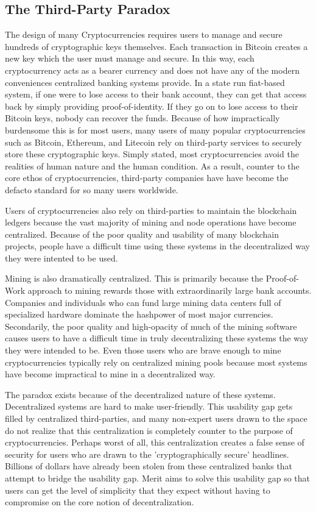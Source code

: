 \documentclass{article}
\begin{document}
\subsection{The Third-Party Paradox}

The design of many Cryptocurrencies requires users to manage and secure hundreds
of cryptographic keys themselves.  Each \gls{transaction} in \gls{Bitcoin} creates
a new key which the user must manage and secure.  In this way, each cryptocurrency
acts as a \gls{bearer currency} and does not have any of the modern conveniences
centralized banking systems provide.  In a state run fiat-based system, if one 
were to lose access to their bank account, they can get that access back 
by simply providing proof-of-identity.  If they go on to lose access to their 
\gls{Bitcoin} keys, nobody can recover the funds.  Because of how impractically 
burdensome this is for most users, many users of many popular cryptocurrencies 
such as \gls{Bitcoin}, \gls{Ethereum}, and \gls{Litecoin} rely on third-party
services to securely store these cryptographic keys.  Simply stated, most
cryptocurrencies avoid the realities of human nature and the human condition. 
As a result, counter to the core ethos of cryptocurrencies, third-party companies
have have become the defacto standard for so many users worldwide.

Users of cryptocurrencies also rely on third-parties to maintain the blockchain ledgers
because the vast majority of mining and node operations have become centralized.
Because of the poor quality and usability of many blockchain projects, people 
have a difficult time using these systems in the decentralized way they were intented to be used.  

Mining is also dramatically centralized.  This is primarily because the Proof-of-Work 
approach to mining rewards those with extraordinarily large bank accounts.  Companies 
and individuals who can fund large mining data centers full of specialized hardware 
dominate the hashpower of most major currencies.  \cite{drypool} Secondarily, 
the poor quality and high-opacity of much of the mining software causes users 
to have a difficult time in truly decentralizing these systems the way they 
were intended to be.  Even those users who are brave enough to mine cryptocurrencies
typically rely on centralized mining pools because most systems have become
impractical to mine in a decentralized way.

The paradox exists because of the decentralized nature of these systems.  Decentralized
systems are hard to make user-friendly.  This usability gap gets filled by centralized
third-parties, and many non-expert users drawn to the space do not realize that this
centralization is completely counter to the purpose of cryptocurrencies.  Perhaps
worst of all, this centralization creates a false sense of security for users who 
are drawn to the 'cryptographically secure' headlines.  Billions of dollars have 
already been stolen from these centralized banks that attempt to bridge the usability gap.  
Merit aims to solve this usability gap so that users can get the level of simplicity
that they expect without having to compromise on the core notion of decentralization.  
\end{document}

